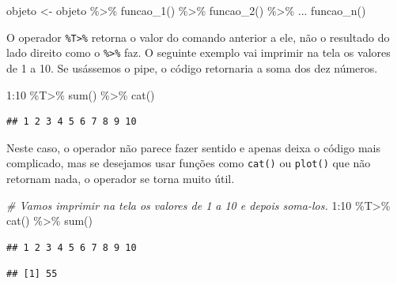 \documentclass[
]{book}
\newenvironment{Shaded}{\begin{snugshade}}{\end{snugshade}}
\newcommand{\CommentTok}[1]{\textcolor[rgb]{0.56,0.35,0.01}{\textit{#1}}}
\newcommand{\DecValTok}[1]{\textcolor[rgb]{0.00,0.00,0.81}{#1}}
\newcommand{\FunctionTok}[1]{\textcolor[rgb]{0.00,0.00,0.00}{#1}}
\newcommand{\NormalTok}[1]{#1}
\newcommand{\OtherTok}[1]{\textcolor[rgb]{0.56,0.35,0.01}{#1}}
\newcommand{\SpecialCharTok}[1]{\textcolor[rgb]{0.00,0.00,0.00}{#1}}
\begin{document}
\begin{Shaded}
\begin{Highlighting}[]
\NormalTok{objeto }\OtherTok{\textless{}{-}}\NormalTok{ objeto }\SpecialCharTok{\%\textgreater{}\%} 
  \FunctionTok{funcao\_1}\NormalTok{() }\SpecialCharTok{\%\textgreater{}\%} 
  \FunctionTok{funcao\_2}\NormalTok{() }\SpecialCharTok{\%\textgreater{}\%} 
\NormalTok{  ...}
  \FunctionTok{funcao\_n}\NormalTok{()}
\end{Highlighting}
\end{Shaded}

O operador \texttt{\%T\textgreater{}\%} retorna o valor do comando anterior a ele, não o resultado do lado direito como o \texttt{\%\textgreater{}\%} faz. O seguinte exemplo vai imprimir na tela os valores de 1 a 10. Se usássemos o pipe, o código retornaria a soma dos dez números.

\begin{Shaded}
\begin{Highlighting}[]
\DecValTok{1}\SpecialCharTok{:}\DecValTok{10} \SpecialCharTok{\%T\textgreater{}\%} \FunctionTok{sum}\NormalTok{() }\SpecialCharTok{\%\textgreater{}\%} \FunctionTok{cat}\NormalTok{()}
\end{Highlighting}
\end{Shaded}

\begin{verbatim}
## 1 2 3 4 5 6 7 8 9 10
\end{verbatim}

Neste caso, o operador não parece fazer sentido e apenas deixa o código mais complicado, mas se desejamos usar funções como \texttt{cat()} ou \texttt{plot()} que não retornam nada, o operador se torna muito útil.

\begin{Shaded}
\begin{Highlighting}[]
\CommentTok{\# Vamos imprimir na tela os valores de 1 a 10 e depois soma{-}los.}
\DecValTok{1}\SpecialCharTok{:}\DecValTok{10} \SpecialCharTok{\%T\textgreater{}\%} 
  \FunctionTok{cat}\NormalTok{() }\SpecialCharTok{\%\textgreater{}\%} 
  \FunctionTok{sum}\NormalTok{()}
\end{Highlighting}
\end{Shaded}

\begin{verbatim}
## 1 2 3 4 5 6 7 8 9 10
\end{verbatim}

\begin{verbatim}
## [1] 55
\end{verbatim}
\end{document}
